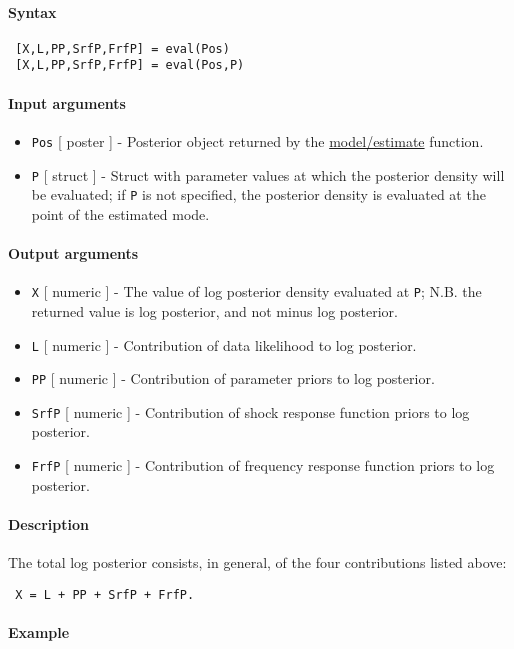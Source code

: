 


	\paragraph{Syntax}
 
 \begin{verbatim}
 [X,L,PP,SrfP,FrfP] = eval(Pos)
 [X,L,PP,SrfP,FrfP] = eval(Pos,P)
 \end{verbatim}
 
 \paragraph{Input arguments}
 
 \begin{itemize}
 \item
   \texttt{Pos} {[} poster {]} - Posterior object returned by the
   \url{model/estimate} function.
 \item
   \texttt{P} {[} struct {]} - Struct with parameter values at which the
   posterior density will be evaluated; if \texttt{P} is not specified,
   the posterior density is evaluated at the point of the estimated mode.
 \end{itemize}
 
 \paragraph{Output arguments}
 
 \begin{itemize}
 \item
   \texttt{X} {[} numeric {]} - The value of log posterior density
   evaluated at \texttt{P}; N.B. the returned value is log posterior, and
   not minus log posterior.
 \item
   \texttt{L} {[} numeric {]} - Contribution of data likelihood to log
   posterior.
 \item
   \texttt{PP} {[} numeric {]} - Contribution of parameter priors to log
   posterior.
 \item
   \texttt{SrfP} {[} numeric {]} - Contribution of shock response
   function priors to log posterior.
 \item
   \texttt{FrfP} {[} numeric {]} - Contribution of frequency response
   function priors to log posterior.
 \end{itemize}
 
 \paragraph{Description}
 
 The total log posterior consists, in general, of the four contributions
 listed above:
 
 \begin{verbatim}
 X = L + PP + SrfP + FrfP.
 \end{verbatim}
 
 \paragraph{Example}


